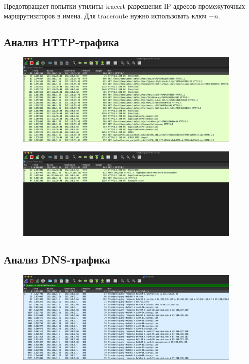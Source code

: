 Предотвращает попытки утилиты tracert разрешения IP-адресов промежуточных маршрутизаторов в имена. Для traceroute нужно использовать ключ $-n$.


\subsection{Анализ HTTP-трафика}

\begin{figure}[H]
	\centering
	\includegraphics[width=0.7\linewidth]{"../Анализ трафика компьютерных сетей утилитой Wireshark/img/http-1"}
	\caption{}
	\label{fig:http-1}
\end{figure}

\begin{figure}[H]
	\centering
	\includegraphics[width=0.7\linewidth]{"../Анализ трафика компьютерных сетей утилитой Wireshark/img/http-2"}
	\caption{}
	\label{fig:http-2}
\end{figure}


\subsection{Анализ DNS-трафика}

\begin{figure}[H]
	\centering
	\includegraphics[width=0.7\linewidth]{"../Анализ трафика компьютерных сетей утилитой Wireshark/img/dns-1"}
	\caption{}
	\label{fig:dns-1}
\end{figure}

